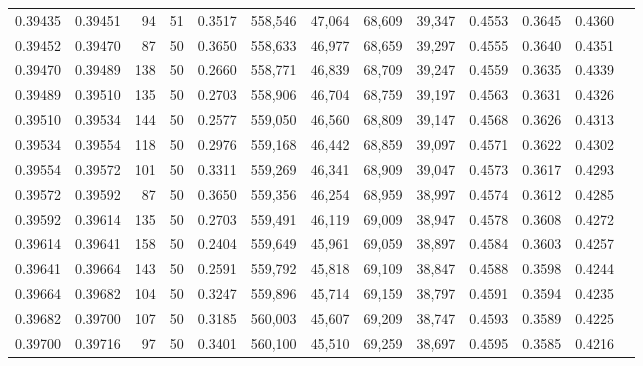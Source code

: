 \begin{tabular}{rrrrrrrrrrrrr}
0.39435 & 0.39451 &    94 &  51 &                                     0.3517 & 558,546 &  47,064 &  68,609 &  39,347 & 0.4553 & 0.3645 & 0.4360 \\
0.39452 & 0.39470 &    87 &  50 &                                     0.3650 & 558,633 &  46,977 &  68,659 &  39,297 & 0.4555 & 0.3640 & 0.4351 \\
0.39470 & 0.39489 &   138 &  50 &                                     0.2660 & 558,771 &  46,839 &  68,709 &  39,247 & 0.4559 & 0.3635 & 0.4339 \\
0.39489 & 0.39510 &   135 &  50 &                                     0.2703 & 558,906 &  46,704 &  68,759 &  39,197 & 0.4563 & 0.3631 & 0.4326 \\
0.39510 & 0.39534 &   144 &  50 &                                     0.2577 & 559,050 &  46,560 &  68,809 &  39,147 & 0.4568 & 0.3626 & 0.4313 \\
0.39534 & 0.39554 &   118 &  50 &                                     0.2976 & 559,168 &  46,442 &  68,859 &  39,097 & 0.4571 & 0.3622 & 0.4302 \\
0.39554 & 0.39572 &   101 &  50 &                                     0.3311 & 559,269 &  46,341 &  68,909 &  39,047 & 0.4573 & 0.3617 & 0.4293 \\
0.39572 & 0.39592 &    87 &  50 &                                     0.3650 & 559,356 &  46,254 &  68,959 &  38,997 & 0.4574 & 0.3612 & 0.4285 \\
0.39592 & 0.39614 &   135 &  50 &                                     0.2703 & 559,491 &  46,119 &  69,009 &  38,947 & 0.4578 & 0.3608 & 0.4272 \\
0.39614 & 0.39641 &   158 &  50 &                                     0.2404 & 559,649 &  45,961 &  69,059 &  38,897 & 0.4584 & 0.3603 & 0.4257 \\
0.39641 & 0.39664 &   143 &  50 &                                     0.2591 & 559,792 &  45,818 &  69,109 &  38,847 & 0.4588 & 0.3598 & 0.4244 \\
0.39664 & 0.39682 &   104 &  50 &                                     0.3247 & 559,896 &  45,714 &  69,159 &  38,797 & 0.4591 & 0.3594 & 0.4235 \\
0.39682 & 0.39700 &   107 &  50 &                                     0.3185 & 560,003 &  45,607 &  69,209 &  38,747 & 0.4593 & 0.3589 & 0.4225 \\
0.39700 & 0.39716 &    97 &  50 &                                     0.3401 & 560,100 &  45,510 &  69,259 &  38,697 & 0.4595 & 0.3585 & 0.4216 \\

\end{tabular}
